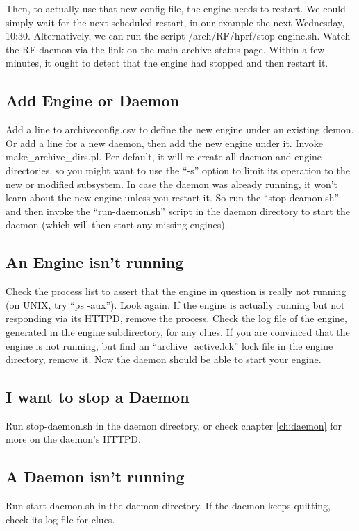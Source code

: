 Then, to actually use that new config file, the engine needs to
restart. We could simply wait for the next scheduled restart, in our
example the next Wednesday, 10:30. Alternatively, we can run the
script /arch/RF/hprf/stop-engine.sh.
Watch the RF daemon via the link on the main archive status page.
Within a few minutes, it ought to detect that the engine had stopped
and then restart it.

\subsection{Add Engine or Daemon}
Add a line to archiveconfig.csv to define the new engine under an
existing demon. Or add a line for a new daemon, then add the new
engine under it. Invoke  make\_archive\_dirs.pl. Per default, it will
re-create all daemon and engine directories, so you might want to use
the ``-s'' option to limit its operation to the new or modified
subsystem.
In case the daemon was already running, it won't learn about the new
engine unless you restart it. So run the ``stop-deamon.sh'' and then
invoke the ``run-daemon.sh'' script in the daemon directory to start
the daemon (which will then start any missing engines).

\subsection{An Engine isn't running}
Check the process list to assert that the engine in question is really not
running (on UNIX, try ``ps -aux''). Look again. If the engine is
actually running but not responding via its HTTPD, remove the process.
Check the log file of the engine, generated in the engine
subdirectory, for any clues. If you are convinced that the engine is
not running, but find an ``archive\_active.lck'' lock file in the
engine directory, remove it. Now the daemon should be able to start
your engine.  

\subsection{I want to stop a Daemon}
Run stop-daemon.sh in the daemon directory, or check chapter
\ref{ch:daemon} for more on the daemon's HTTPD.

\subsection{A Daemon isn't running}
Run start-daemon.sh in the daemon directory. If the daemon keeps quitting,
check its log file for clues.


